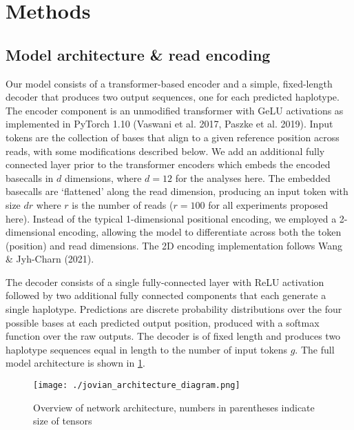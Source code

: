 \documentclass[]{article}
\begin{document}
\section{Methods}

\subsection{Model architecture \& read encoding}

Our model consists of a transformer-based encoder and a simple, fixed-length decoder that produces two output sequences, one for each predicted haplotype. The encoder component is an unmodified transformer with GeLU activations as implemented in PyTorch 1.10 (Vaswani et al. 2017, Paszke et al. 2019). Input tokens are the collection of bases that align to a given reference position across reads, with some modifications described below. We add an additional fully connected layer prior to the transformer encoders which embeds the encoded basecalls in $d$ dimensions, where $d=12$ for the analyses here. The embedded basecalls are `flattened' along the read dimension, producing an input token with size $dr$ where $r$ is the number of reads ($r=100$ for all experiments proposed here).  Instead of the typical 1-dimensional positional encoding, we employed a 2-dimensional encoding, allowing the model to differentiate across both the token (position) and read dimensions. The 2D encoding implementation follows Wang \& Jyh-Charn (2021).

The decoder consists of a single fully-connected layer with ReLU activation followed by two additional fully connected components that each generate a single haplotype. Predictions are discrete probability distributions over the four possible bases at each predicted output position, produced with a softmax function over the raw outputs. The decoder is of fixed length and produces two haplotype sequences equal in length to the number of input tokens $g$. The full model architecture is shown in \ref{fig:architecture}. 


\begin{figure}[htp]
	\texttt{[image: ./jovian\_architecture\_diagram.png]}
	\caption{ Overview of network architecture, numbers in parentheses indicate size of tensors  }
	\label{fig:architecture}
\end{figure}
\end{document}
